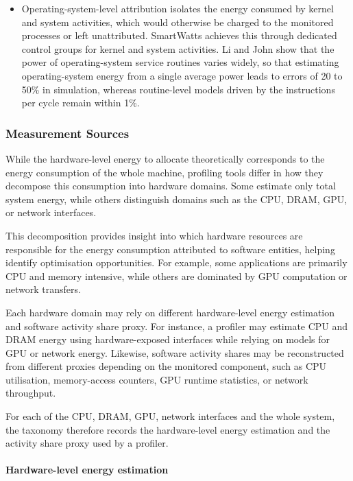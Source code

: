 \documentclass[
  acmsmall,
  screen,
  review,
  xcolor={dvipsnames,usenames}
]{acmart}
\begin{document}
\begin{itemize}
    \item Operating-system-level attribution isolates the energy consumed by kernel and system activities, which would otherwise be charged to the monitored processes or left unattributed. SmartWatts \cite{fieniSmartWattsSelfCalibratingSoftwareDefined2020} achieves this through dedicated control groups for kernel and system activities. Li and John \cite{liRuntimeModelingEstimation2003} show that the power of operating-system service routines varies widely, so that estimating operating-system energy from a single average power leads to errors of 20 to 50\% in simulation, whereas routine-level models driven by the instructions per cycle remain within 1\%.
\end{itemize}


\subsubsection{\textbf{Measurement Sources}}

While the hardware-level energy to allocate theoretically corresponds to the energy consumption of the whole machine, profiling tools differ in how they decompose this consumption into hardware domains. Some estimate only total system energy, while others distinguish domains such as the CPU, DRAM, GPU, or network interfaces.

This decomposition provides insight into which hardware resources are responsible for the energy consumption attributed to software entities, helping identify optimisation opportunities. For example, some applications are primarily CPU and memory intensive, while others are dominated by GPU computation or network transfers.

Each hardware domain may rely on different hardware-level energy estimation and software activity share proxy. For instance, a profiler may estimate CPU and DRAM energy using hardware-exposed interfaces while relying on models for GPU or network energy. Likewise, software activity shares may be reconstructed from different proxies depending on the monitored component, such as CPU utilisation, memory-access counters, GPU runtime statistics, or network throughput.

For each of the CPU, DRAM, GPU, network interfaces and the whole system, the taxonomy therefore records the hardware-level energy estimation and the activity share proxy used by a profiler.

\paragraph{\textbf{Hardware-level energy estimation}}
\end{document}
